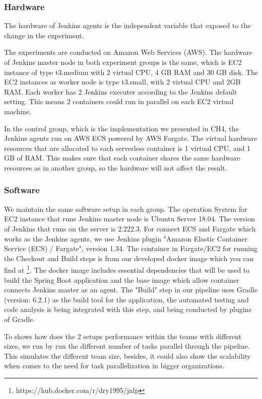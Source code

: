 \subsubsection{Hardware}
The hardware of Jenkins agents is the independent variable that exposed to the change in the experiment.
\par
The experiments are conducted on Amazon Web Services (AWS). The hardware of Jenkins master node in both experiment groups is the same, which is EC2 instance of type t3.medium with 2 virtual CPU, 4 GB RAM and 30 GB disk. The EC2 instances as worker node is type t3.small, with 2 virtual CPU and 2GB RAM. Each worker has 2 Jenkins executer according to the Jenkins default setting. This means 2 containers could run in parallel on each EC2 virtual machine.
\par
In the control group, which is the implementation we presented in CH4, the Jenkins agents run on AWS ECS powered by AWS Fargate. The virtual hardware resources that are allocated to each serverless container is 1 virtual CPU, and 1 GB of RAM. This makes sure that each container shares the same hardware resources as in another group, so the hardware will not affect the result.
\subsubsection{Software}
We maintain the same software setup in each group. The operation System for EC2 instance that runs Jenkins master node is Ubuntu Server 18.04. The version of Jenkins that runs on the server is 2.222.3. For connect ECS and Fargate which works as the Jenkins agents, we use Jenkins plugin "Amazon Elastic Container Service (ECS) / Fargate", version 1.34. The container in Fargate/EC2 for running the Checkout and Build steps is from our developed docker image which you can find at \footnote{https://hub.docker.com/r/dry1995/jnlp}. The docker image includes essential dependencies that will be used to build the Spring Boot application and the base image which allow container connects Jenkins master as an agent. The "Build" step in our pipeline uses Gradle (version: 6.2.1) as the build tool for the application, the automated testing and code analysis is being integrated with this step, and being conducted by plugins of Gradle.

\par
To shows how does the 2 setups performance within the teams with different sizes, we run by run the different number of tasks parallel through the pipeline. This simulates the different team size, besides, it could also show the scalability when comes to the need for task parallelization in bigger organizations.

